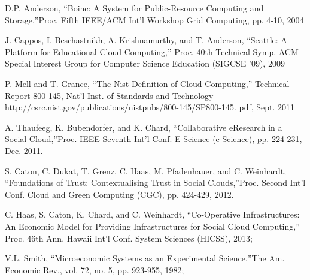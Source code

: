 \documentclass[a4paper,12pt]{article}
\begin{document}
\begin{thebibliography}{99}
         {D.P. Anderson, “Boinc: A System for Public-Resource Computing
and Storage,”Proc. Fifth IEEE/ACM Int’l Workshop Grid Computing,
pp. 4-10, 2004}

         {J. Cappos, I. Beschastnikh, A. Krishnamurthy, and T. Anderson,
“Seattle: A Platform for Educational Cloud Computing,” Proc.
40th Technical Symp. ACM Special Interest Group for Computer Science Education (SIGCSE ’09), 2009}

         {P. Mell and T. Grance, “The Nist Definition of Cloud Computing,”
Technical Report 800-145, Nat’l Inst. of Standards and Technology
http://csrc.nist.gov/publications/nistpubs/800-145/SP800-145.
pdf, Sept. 2011}

         {A. Thaufeeg, K. Bubendorfer, and K. Chard, “Collaborative eResearch in a Social Cloud,”Proc. IEEE Seventh Int’l Conf. E-Science
(e-Science), pp. 224-231, Dec. 2011.}

         {S. Caton, C. Dukat, T. Grenz, C. Haas, M. Pfadenhauer, and C.
Weinhardt, “Foundations of Trust: Contextualising Trust in
Social Clouds,”Proc. Second Int’l Conf. Cloud and Green Computing
(CGC), pp. 424-429, 2012.}

         {C. Haas, S. Caton, K. Chard, and C. Weinhardt, “Co-Operative
Infrastructures: An Economic Model for Providing Infrastructures
for Social Cloud Computing,” Proc. 46th Ann. Hawaii Int’l Conf.
System Sciences (HICSS), 2013;}

         {V.L. Smith, “Microeconomic Systems as an Experimental Science,”The Am. Economic Rev., vol. 72, no. 5, pp. 923-955, 1982;}

    \end{thebibliography}

	
		
\end{document}
